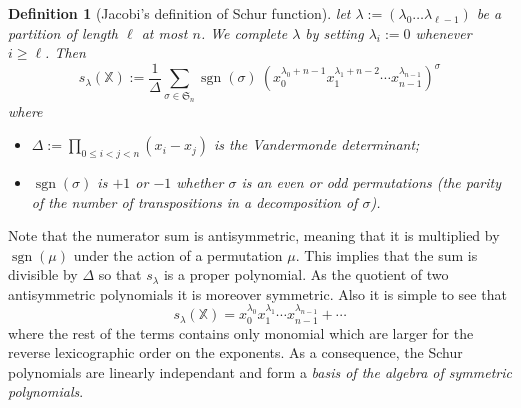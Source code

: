 \documentclass[12pt,a4paper]{article}
\newcommand{\SG}{{\mathfrak S}}
\newcommand{\sgn}{\operatorname{sgn}}
\newcommand{\alphX}{{\mathbb X}}
\newtheorem{DEFN}{Definition}
\begin{document}
\begin{DEFN}[Jacobi's definition of Schur function]
  let $\lambda:=(\lambda_0\dots\lambda_{\ell-1})$ be a partition of length
  $\ell$ at most $n$. We complete $\lambda$ by setting $\lambda_i:=0$ whenever
  $i\geq\ell$. Then
  \begin{equation}
    s_{\lambda} (\alphX) :=
    \frac{1}{\Delta}\sum_{\sigma\in\SG_n}
    \sgn(\sigma)\ 
    (x_0^{\lambda_0 + n-1}x_1^{\lambda_1 + n-2}\cdots x_{n-1}^{\lambda_{n-1}})^\sigma
  \end{equation}
  where
  \begin{itemize}
  \item $\Delta:=\prod_{0\leq i<j<n} (x_i - x_j)$ is the Vandermonde
    determinant;
  \item $\sgn(\sigma)$ is $+1$ or $-1$ whether $\sigma$ is an
    even or odd permutations (the parity of the number of transpositions in a
    decomposition of $\sigma$).
  \end{itemize}
\end{DEFN}
Note that the numerator sum is antisymmetric, meaning that it is multiplied by
$\sgn(\mu)$ under the action of a permutation $\mu$.  This implies that the
sum is divisible by $\Delta$ so that $s_\lambda$ is a proper polynomial. As
the quotient of two antisymmetric polynomials it is moreover symmetric. Also
it is simple to see that
\begin{equation}
s_{\lambda} (\alphX) =
   x_0^{\lambda_0}x_1^{\lambda_1}\cdots x_{n-1}^{\lambda_{n-1}} +  \cdots
\end{equation}
where the rest of the terms contains only monomial which are larger for the
reverse lexicographic order on the exponents. As a consequence, the Schur
polynomials are linearly independant and form a \emph{basis of the algebra of
  symmetric polynomials}.
\end{document}
